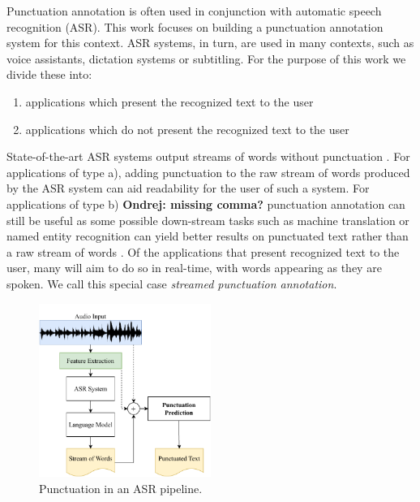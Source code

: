 \documentclass[bsc,deptreport,ai]{infthesis} %
\newcommand{\Ondrej}[1]{{\color{red} \textbf{Ondrej: #1}}}
\begin{document}
Punctuation annotation is often used in conjunction with automatic speech recognition (ASR). This work focuses on building a punctuation annotation system for this context.
ASR systems, in turn, are used in many contexts, such as voice assistants, dictation systems or subtitling. For the purpose of this work we divide these into:
\begin{enumerate}[label=\alph*)]
    \item applications which present the recognized text to the user
    \item applications which do not present the recognized text to the user
\end{enumerate}
State-of-the-art ASR systems output streams of words without punctuation \citep{nemo_documentation}. For applications of type a), adding punctuation to the raw stream of words produced by the ASR system can aid readability for the user of such a system. For applications of type b)\Ondrej{missing comma?} punctuation annotation can still be useful as some possible down-stream tasks such as machine translation or named entity recognition can yield better results on punctuated text rather than a raw stream of words \citep{transfer_learning_sota}. Of the applications that present recognized text to the user, many will aim to do so in real-time, with words appearing as they are spoken. We call this special case \emph{streamed punctuation annotation}.

\begin{figure}[t]
\centering
\includegraphics[width=0.50\textwidth]{1_1_01.pdf}
\caption{Punctuation in an ASR pipeline.}
\label{fig:1_1_01}
\end{figure}
\end{document}
